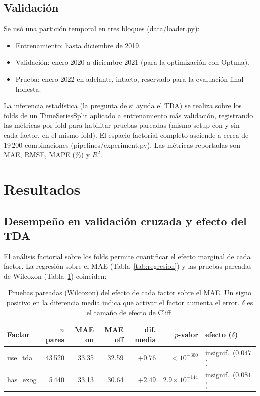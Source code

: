 \documentclass[11pt,a4paper]{article}
\begin{document}
\subsection{Validación}
Se usó una partición temporal en tres bloques (data/loader.py):
\begin{itemize}[noitemsep]
  \item Entrenamiento: hasta diciembre de 2019.
  \item Validación: enero 2020 a diciembre 2021 (para la optimización con Optuna).
  \item Prueba: enero 2022 en adelante, intacto, reservado para la evaluación
        final honesta.
\end{itemize}
La inferencia estadística (la pregunta de si ayuda el TDA) se realiza sobre los
folds de un TimeSeriesSplit aplicado a entrenamiento más validación, registrando
las métricas por fold para habilitar pruebas pareadas (mismo setup con y sin
cada factor, en el mismo fold). El espacio factorial completo asciende a cerca de
19\,200 combinaciones (pipelines/experiment.py). Las métricas reportadas son MAE,
RMSE, MAPE (\%) y $R^2$.

\section{Resultados}

\subsection{Desempeño en validación cruzada y efecto del TDA}
El análisis factorial sobre los folds permite cuantificar el efecto marginal de
cada factor. La regresión sobre el MAE (Tabla~\ref{tab:regresion}) y las pruebas
pareadas de Wilcoxon (Tabla~\ref{tab:pareadas}) coinciden:

\begin{table}[H]
  \centering
  \caption{Pruebas pareadas (Wilcoxon) del efecto de cada factor sobre el MAE.
  Un signo positivo en la diferencia media indica que activar el factor aumenta
  el error. $\delta$ es el tamaño de efecto de Cliff.}
  \label{tab:pareadas}
  \small
  \begin{tabular}{lrrrrrl}
    \toprule
    Factor & $n$ pares & MAE on & MAE off & dif. media & $p$-valor & efecto ($\delta$) \\
    \midrule
    use\_tda  & 43\,520 & 33.35 & 32.59 & $+0.76$ & $<10^{-300}$ & insignif.\ ($0.047$) \\
    has\_exog & 5\,440  & 33.13 & 30.64 & $+2.49$ & $2.9\!\times\!10^{-144}$ & insignif.\ ($0.081$) \\
    \bottomrule
  \end{tabular}
\end{table}
\end{document}
